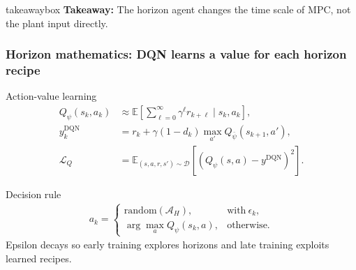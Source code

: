 \documentclass[aspectratio=169]{beamer}
\newcommand{\takeawaybox}[1]{%
\vspace{0.02cm}
\begin{center}
\begin{beamercolorbox}[wd=0.94\textwidth,sep=3pt,center,rounded=true,shadow=false]{takeawaybox}
\scriptsize
\textbf{\textcolor{maroon1}{Takeaway:}} #1
\end{beamercolorbox}
\end{center}
}
\begin{document}
\begin{frame}
\takeawaybox{The horizon agent changes the time scale of MPC, not the plant input directly.}
\end{frame}

\begin{frame}
\frametitle{\large \textbf{Horizon mathematics: DQN learns a value for each horizon recipe}}
\scriptsize

\begin{block}{Action-value learning}
\begin{align*}
Q_\psi(s_k,a_k)
&\approx \mathbb{E}\left[\sum_{\ell=0}^{\infty}\gamma^\ell r_{k+\ell}\mid s_k,a_k\right],\\
y_k^{\mathrm{DQN}}
&= r_k+\gamma(1-d_k)\max_{a'} Q_{\bar{\psi}}(s_{k+1},a'),\\
\mathcal{L}_{Q}
&= \mathbb{E}_{(s,a,r,s')\sim\mathcal{D}}
\left[\left(Q_\psi(s,a)-y^{\mathrm{DQN}}\right)^2\right].
\end{align*}
\end{block}

\begin{block}{Decision rule}
\begin{align*}
a_k =
\begin{cases}
\mathrm{random}(\mathcal{A}_H), & \mathrm{with}\ \epsilon_k,\\
\arg\max_a Q_\psi(s_k,a), & \mathrm{otherwise}.
\end{cases}
\end{align*}
Epsilon decays so early training explores horizons and late training exploits learned recipes.
\end{block}

\end{frame}
\end{document}
